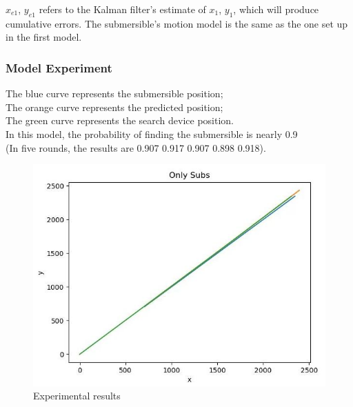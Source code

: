 \documentclass[12pt]{article}  %
\begin{document}
\indent $x_{e1}$, $y_{e1}$ refers to the Kalman filter's estimate of $x_1$, $y_1$, which will produce cumulative errors. The submersible's motion model is the same as the one set up in the first model.

\subsubsection{Model Experiment}
\indent The blue curve represents the submersible position;\\
\indent The orange curve represents the predicted position;\\
\indent The green curve represents the search device position.\\   
\indent In this model, the probability of finding the submersible is nearly 0.9\\
(In five rounds, the results are 0.907 0.917 0.907 0.898 0.918). 
\begin{figure}[htbp]  %
    \centering  %
    \includegraphics[width=.7\textwidth]{predictionfollowing.jpg} %
    \caption{Experimental results} %
    \end{figure}
    \vspace{-0.8cm}

\indent \\
\indent \\
\indent \\
\indent \\
\indent \\
\indent \\
\indent \\
\indent \\
\indent \\
\end{document}

